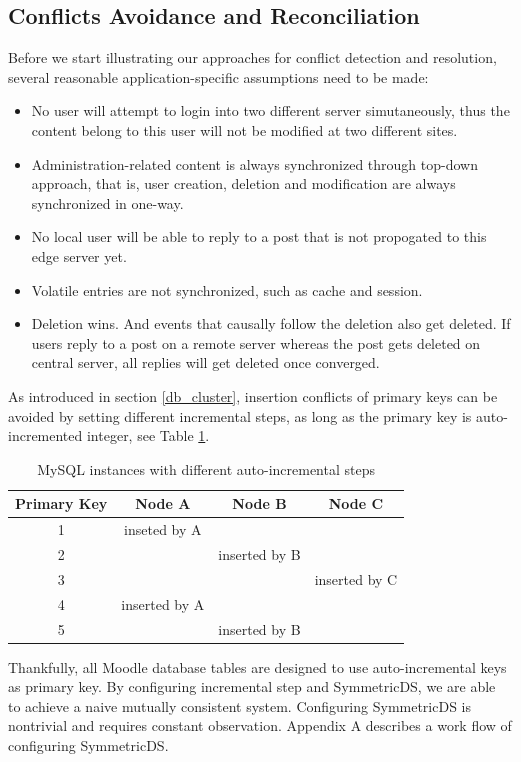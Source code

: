 \subsection{Conflicts Avoidance and Reconciliation} \label{multi_master}
Before we start illustrating our approaches for conflict detection and resolution, several reasonable application-specific assumptions need to be made:
\begin{itemize}
\item No user will attempt to login into two different server simutaneously, thus the content belong to this user will not be modified at two different sites.
\item Administration-related content is always synchronized through top-down approach, that is, user creation, deletion and modification are always synchronized in one-way.
\item No local user will be able to reply to a post that is not propogated to this edge server yet.
\item Volatile entries are not synchronized, such as cache and session.
\item Deletion wins. And events that causally follow the deletion also get deleted. If users reply to a post on a remote server whereas the post gets deleted on central server, all replies will get deleted once converged.
\end{itemize}

As introduced in section \ref{db_cluster}, insertion conflicts of primary keys can be avoided by setting different incremental steps, as long as the primary key is auto-incremented integer, see Table \ref{mysql_key_inc}.

\begin{table}[htbp]
\centering
\begin{tabular}{c|c|c|c}
Primary Key & Node A & Node B & Node C\\
\hline
1 & inseted by A & & \\
2 & & inserted by B & \\
3 & & & inserted by C \\
4 & inserted by A & & \\
5 & & inserted by B & \\
\end{tabular}
\caption{MySQL instances with different auto-incremental steps}
\label{mysql_key_inc}
\end{table}


Thankfully, all Moodle database tables are designed to use auto-incremental keys as primary key. By configuring incremental step and SymmetricDS, we are able to achieve a naive mutually consistent system. Configuring SymmetricDS is nontrivial and requires constant observation. Appendix A describes a work flow of configuring SymmetricDS.

